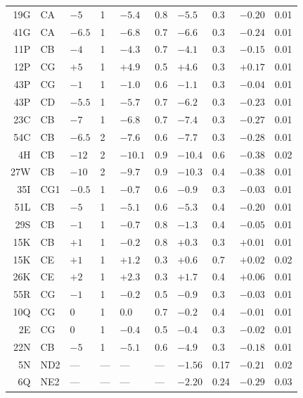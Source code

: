 \documentclass[twocolumn]{svjour3}           %
\begin{document}
\begin{table}
\begin{tabular}{|rl|ll|ll|ll|ll|}
\noalign{\smallskip}\hline\noalign{\smallskip}
19G & CA  & $-5$   & 1 & $-5.4$  & 0.8 & $-5.5$  & 0.3  & $-0.20$  & 0.01 \\
41G & CA  & $-6.5$ & 1 & $-6.8$  & 0.7 & $-6.6$  & 0.3  & $-0.24$  & 0.01 \\
11P & CB  & $-4$   & 1 & $-4.3$  & 0.7 & $-4.1$  & 0.3  & $-0.15$  & 0.01 \\
12P & CG  & $+5$   & 1 & $+4.9$  & 0.5 & $+4.6$  & 0.3  & $+0.17$  & 0.01 \\
43P & CG  & $-1$   & 1 & $-1.0$  & 0.6 & $-1.1$  & 0.3  & $-0.04$  & 0.01 \\
43P & CD  & $-5.5$ & 1 & $-5.7$  & 0.7 & $-6.2$  & 0.3  & $-0.23$  & 0.01 \\
23C & CB  & $-7$   & 1 & $-6.8$  & 0.7 & $-7.4$  & 0.3  & $-0.27$  & 0.01 \\
54C & CB  & $-6.5$ & 2 & $-7.6$  & 0.6 & $-7.7$  & 0.3  & $-0.28$  & 0.01 \\
 4H & CB  & $-12$  & 2 & $-10.1$ & 0.9 & $-10.4$  & 0.6  & $-0.38$  & 0.02 \\
27W & CB  & $-10$  & 2 & $-9.7$  & 0.9 & $-10.3$  & 0.4  & $-0.38$  & 0.01 \\
35I & CG1 & $-0.5$ & 1 & $-0.7$  & 0.6 & $-0.9$  & 0.3  & $-0.03$  & 0.01 \\
51L & CB  & $-5$   & 1 & $-5.1$  & 0.6 & $-5.3$  & 0.4  & $-0.20$  & 0.01 \\
29S & CB  & $-1$   & 1 & $-0.7$  & 0.8 & $-1.3$  & 0.4  & $-0.05$  & 0.01 \\
15K & CB  & $+1$   & 1 & $-0.2$  & 0.8 & $+0.3$  & 0.3  & $+0.01$  & 0.01 \\
15K & CE  & $+1$   & 1 & $+1.2$  & 0.3 & $+0.6$  & 0.7  & $+0.02$  & 0.02 \\
26K & CE  & $+2$   & 1 & $+2.3$  & 0.3 & $+1.7$  & 0.4  & $+0.06$  & 0.01 \\
55R & CG  & $-1$   & 1 & $-0.2$  & 0.5 & $-0.9$  & 0.3  & $-0.03$  & 0.01 \\
10Q & CG  & \M$0$   & 1 & \M$0.0$  & 0.7 & $-0.2$  & 0.4  & $-0.01$  & 0.01 \\
 2E & CG  & \M$0$  & 1 & $-0.4$  & 0.5 & $-0.4$  & 0.3  & $-0.02$  & 0.01 \\
22N & CB  & $-5$   & 1 & $-5.1$  & 0.6 & $-4.9$  & 0.3  & $-0.18$  & 0.01 \\
 5N & ND2 & ---    &---&---      & --- & $-1.56$ & 0.17 & $-0.21$  & 0.02 \\
 6Q & NE2 & ---    &---&---      & --- & $-2.20$ & 0.24 & $-0.29$  & 0.03 \\

\end{tabular}
\end{table}
\end{document}
